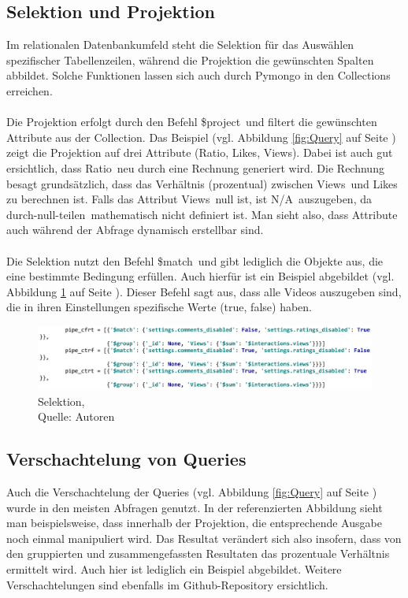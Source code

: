 \documentclass[12pt,titlepage]{article}
\begin{document}
\subsection{Selektion und Projektion} \label{Projektion}
Im relationalen Datenbankumfeld steht die Selektion für das Auswählen spezifischer Tabellenzeilen, während die Projektion die gewünschten Spalten abbildet. Solche Funktionen lassen sich auch durch Pymongo in den Collections erreichen. \\
\\
Die Projektion erfolgt durch den Befehl \glqq \$project\grqq\, und filtert die gewünschten Attribute aus der Collection. Das Beispiel (vgl. Abbildung \ref{fig:Query} auf Seite \pageref{fig:Query}) zeigt die Projektion auf drei Attribute (Ratio, Likes, Views). Dabei ist auch gut ersichtlich, dass \glqq Ratio\grqq\, neu durch eine Rechnung generiert wird. Die Rechnung besagt grundsätzlich, dass das Verhältnis (prozentual) zwischen \glqq Views\grqq\, und \glqq Likes\grqq\, zu berechnen ist. Falls das Attribut \glqq Views\grqq\, null ist, ist \glqq N/A\grqq\, auszugeben, da \glqq durch-null-teilen\grqq\, mathematisch nicht definiert ist. Man sieht also, dass Attribute auch während der Abfrage dynamisch erstellbar sind.\\
\\
Die Selektion nutzt den Befehl \glqq \$match\grqq\, und gibt lediglich die Objekte aus, die eine bestimmte Bedingung erfüllen. Auch hierfür ist ein Beispiel abgebildet (vgl. Abbildung \ref{fig:Selektion} auf Seite \pageref{fig:Selektion}). Dieser Befehl sagt aus, dass alle Videos auszugeben sind, die in ihren Einstellungen spezifische Werte (true, false) haben. 
\begin{figure}[h]
\centering
\includegraphics[width=15cm]{IMG/Selektion.PNG}
\caption[Selektion]{Selektion,\\ Quelle: Autoren} \label{fig:Selektion}
\end{figure}


\subsection{Verschachtelung von Queries}
Auch die Verschachtelung der Queries (vgl. Abbildung \ref{fig:Query} auf Seite \pageref{fig:Query}) wurde in den meisten Abfragen genutzt. In der referenzierten Abbildung sieht man beispielsweise, dass innerhalb der Projektion, die entsprechende Ausgabe noch einmal manipuliert wird. Das Resultat verändert sich also insofern, dass von den gruppierten und zusammengefassten Resultaten das prozentuale Verhältnis ermittelt wird. Auch hier ist lediglich ein Beispiel abgebildet. Weitere Verschachtelungen sind ebenfalls im Github-Repository  ersichtlich. 
\newpage
\end{document}
